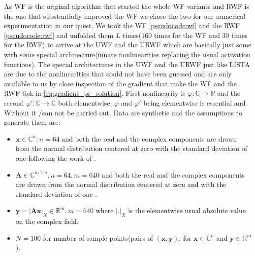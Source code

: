 As \ac{WF} is the original algorithm that started the whole \ac{WF} variants and \ac{RWF} is the one that substantially 
improved the \ac{WF} we chose the two for our numerical experimentation in our \du quest. We took the \ac{WF}\cite{Candes2014} 
\cref{pseudocode:wf} and the \ac{RWF}\cite{Zhang2016} 
\cref{pseudocode:rwf} and unfolded them $L$ times($160$ times for the \ac{WF} and $30$ times for 
the \ac{RWF}) to arrive at the \ac{UWF} and the \ac{URWF} which are basically 
just some \nn\cite{Goodfellow2016}\cite{Bishop2006}\index{\nn} 
with some special architecture(innate nonlinearities replacing the usual activation functions). The special architectures in the \ac{UWF} and the \ac{URWF} 
just like \ac{LISTA} are due to the nonlinearities that could not have been guessed and are only available to us by close inspection of the gradient that make 
the \ac{WF} and the \ac{RWF} tick in \cref{eq:gradient_pr_solution}. First nonlinearity is $\varphi \colon \mathbb{C} \rightarrow \mathbb{R}$ and the second $\varphi' \colon \mathbb{C} \rightarrow \mathbb{C}$ both elementwise. 
$\varphi$ and $\varphi'$ being elementwise is essential and Without it \ml/\dl can not be carried out. 
Data are synthetic and the assumptions to generate them are:
\begin{itemize}
  \item $\boldsymbol{x} \in \mathbb{C}^{n}, n=64$ and both the real and the complex components are drawn from the normal distribution 
  centered at zero with the standard deviation of one following the work of \cite{Naimipour2020}\cite{Naimipour2020a}.
  \item $\boldsymbol{A} \in \mathbb{C}^{m \times n}, n=64, m=640$ and both the real and the complex components are drawn from the normal distribution 
  centered at zero and with the standard deviation of one \cite{Naimipour2020}\cite{Naimipour2020a}.
  \item $\boldsymbol{y}= \left|\boldsymbol{A}\boldsymbol{x}\right|_{X} \in \mathbb{R}^m, m=640$ where $\left|\boldsymbol{.}\right|_X$ is the elementwise usual absolute value on the complex field.
  \item $N=100$ for number of sample points(pairs of $(\boldsymbol{x},\boldsymbol{y})$, for $\boldsymbol{x} \in \mathbb{C}^n$ and $\boldsymbol{y} \in \mathbb{R}^m$ ).
\end{itemize}

